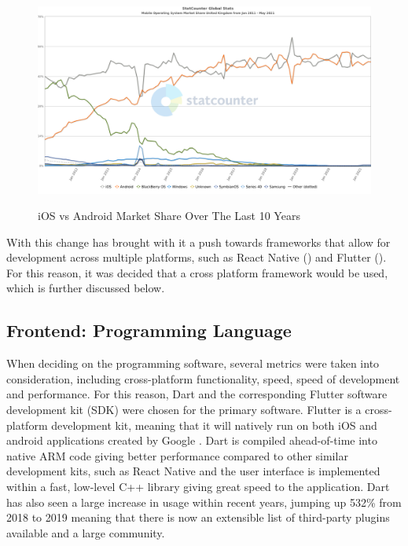 \documentclass[12pt]{article}
\begin{document}
	\begin{figure}[H]
		\centering
		\includegraphics[scale=0.4]{images/ios-android.png}
		\caption{iOS vs Android Market Share Over The Last 10 Years}
		\label{fig:ios-android}
		\cite{AndroidVsIOS2021}
	\end{figure}
	
	With this change has brought with it a push towards frameworks that allow for development across multiple platforms, such as React Native (\cite{ReactNativeLearn}) and Flutter (\cite{FlutterBeautifulNative}). For this reason, it was decided that a cross platform framework would be used, which is further discussed below.
	
	\subsection{Frontend: Programming Language}
	When deciding on the programming software, several metrics were taken into consideration, including cross-platform functionality, speed, speed of development and performance. For this reason, Dart and the corresponding Flutter software development kit (SDK) were chosen for the primary software. Flutter is a cross-platform development kit, meaning that it will natively run on both iOS and android applications created by Google \cite{FlutterBeautifulNative}. Dart is compiled ahead-of-time into native ARM code giving better performance compared to other similar development kits, such as React Native and the user interface  is implemented within a fast, low-level C++ library giving great speed to the application. Dart has also seen a large increase in usage within recent years, jumping up 532\% from 2018 to 2019 \cite{StateOctoverse2019} meaning that there is now an extensible list of third-party plugins available and a large community.
	
\end{document}
